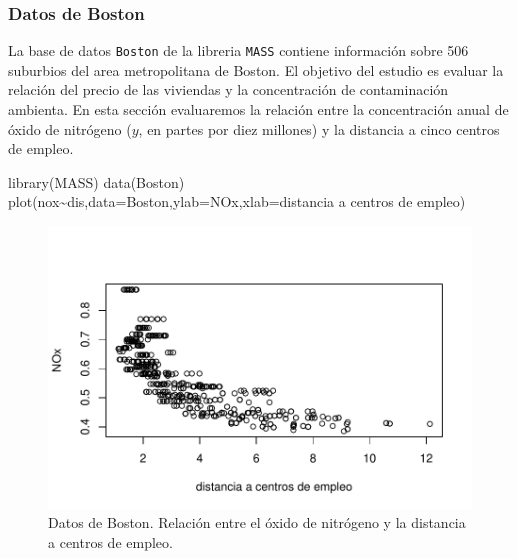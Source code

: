 \documentclass[
]{article}
\newenvironment{Shaded}{\begin{snugshade}}{\end{snugshade}}
\newcommand{\AttributeTok}[1]{\textcolor[rgb]{0.77,0.63,0.00}{#1}}
\newcommand{\FunctionTok}[1]{\textcolor[rgb]{0.00,0.00,0.00}{#1}}
\newcommand{\NormalTok}[1]{#1}
\newcommand{\SpecialCharTok}[1]{\textcolor[rgb]{0.00,0.00,0.00}{#1}}
\newcommand{\StringTok}[1]{\textcolor[rgb]{0.31,0.60,0.02}{#1}}
\begin{document}
\hypertarget{datos-de-boston}{%
\subsubsection{Datos de Boston}\label{datos-de-boston}}

La base de datos \texttt{Boston} de la libreria \texttt{MASS} contiene información sobre 506 suburbios del area metropolitana de Boston. El objetivo del estudio es evaluar la relación del precio de las viviendas y la concentración de contaminación ambienta. En esta sección evaluaremos la relación entre la concentración anual de óxido de nitrógeno (\(y\), en partes por diez millones) y la distancia a cinco centros de empleo.

\begin{Shaded}
\begin{Highlighting}[]
\FunctionTok{library}\NormalTok{(MASS)}
\FunctionTok{data}\NormalTok{(Boston)}
\FunctionTok{plot}\NormalTok{(nox}\SpecialCharTok{\textasciitilde{}}\NormalTok{dis,}\AttributeTok{data=}\NormalTok{Boston,}\AttributeTok{ylab=}\StringTok{\textquotesingle{}NOx\textquotesingle{}}\NormalTok{,}\AttributeTok{xlab=}\StringTok{\textquotesingle{}distancia a centros de empleo\textquotesingle{}}\NormalTok{)}
\end{Highlighting}
\end{Shaded}

\begin{figure}

{\centering \includegraphics{MLG2_files/figure-latex/BostonFigure-1} 

}

\caption{Datos de Boston. Relación entre el óxido de nitrógeno y la distancia a centros de empleo.}\label{fig:BostonFigure}
\end{figure}
\end{document}

